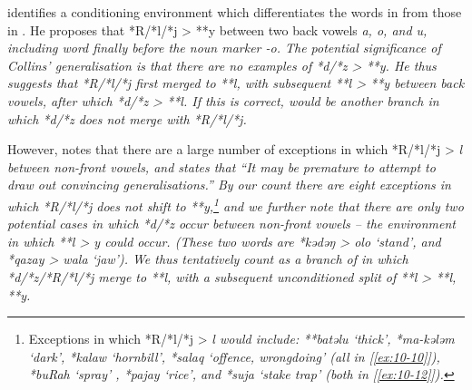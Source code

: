 \citet[112]{Collins1983} identifies a conditioning environment
which differentiates the words in  from those in .
He proposes that *R/*l/*j > **y between two back vowels \it{a,
o,} and \it{u,} including word finally before the noun marker \it{-o}.
The potential significance of Collins’ generalisation is that
there are no examples of *d/*z > **y.
He thus suggests that *R/*l/*j first merged to **l,
with subsequent **l > **y between back vowels,
after which *d/*z > **l.
If this is correct,
 would be another branch in which *d/*z does
not merge with *R/*l/*j.

However, \citet[113]{Collins1983} notes that there are a large
number of exceptions in which *R/*l/*j > \it{l} between non-front
vowels, and states that “It may be premature to attempt to draw out convincing
generalisations.” By our count there are eight exceptions in
which *R/*l/*j does not shift to **y,\footnote{
		Exceptions in
		which *R/*l/*j > \it{l} would include: **batəlu ‘thick’,
		*ma-kələm ‘dark’, *kalaw ‘hornbill’,
		*salaq ‘offence, wrongdoing’ (all in [\ref{ex:10-10}]),
		*buRah ‘spray’ , *pajay ‘rice’,
		and *suja ‘stake trap’ (both in [\ref{ex:10-12}]).}
and we further note that there are only two potential cases in
which *d/*z occur between non-front vowels -- the environment
in which **l > \it{y} could occur.
(These two words are *kədəŋ > \it{olo} ‘stand’,
and *qazay > \it{wala} ‘jaw’).
We thus tentatively count  as a branch of
 in which *d/*z/*R/*l/*j merge to **l,
with a subsequent unconditioned split of **l > **l, **y.

